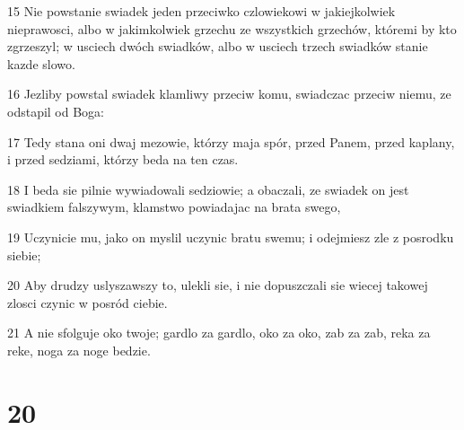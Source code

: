 \par 15 Nie powstanie swiadek jeden przeciwko czlowiekowi w jakiejkolwiek nieprawosci, albo w jakimkolwiek grzechu ze wszystkich grzechów, któremi by kto zgrzeszyl; w usciech dwóch swiadków, albo w usciech trzech swiadków stanie kazde slowo.
\par 16 Jezliby powstal swiadek klamliwy przeciw komu, swiadczac przeciw niemu, ze odstapil od Boga:
\par 17 Tedy stana oni dwaj mezowie, którzy maja spór, przed Panem, przed kaplany, i przed sedziami, którzy beda na ten czas.
\par 18 I beda sie pilnie wywiadowali sedziowie; a obaczali, ze swiadek on jest swiadkiem falszywym, klamstwo powiadajac na brata swego,
\par 19 Uczynicie mu, jako on myslil uczynic bratu swemu; i odejmiesz zle z posrodku siebie;
\par 20 Aby drudzy uslyszawszy to, ulekli sie, i nie dopuszczali sie wiecej takowej zlosci czynic w posród ciebie.
\par 21 A nie sfolguje oko twoje; gardlo za gardlo, oko za oko, zab za zab, reka za reke, noga za noge bedzie.

\chapter{20}

